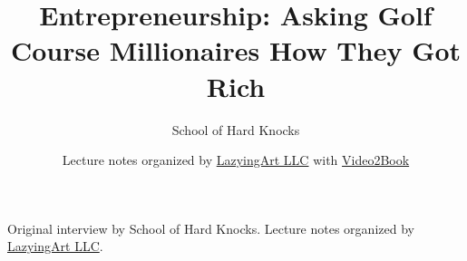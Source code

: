 \documentclass[11pt,oneside]{book}
\begin{document}
\frontmatter
\title{Entrepreneurship: Asking Golf Course Millionaires How They Got Rich}
\author{School of Hard Knocks}
\date{Lecture notes organized by \href{https://lazying.art}{LazyingArt LLC} with \href{https://github.com/lachlanchen/Video2Book}{Video2Book}}
\maketitle
\begin{center}
\small Original interview by School of Hard Knocks. Lecture notes organized by \href{https://lazying.art}{LazyingArt LLC}.
\end{center}
\clearpage
\mainmatter

\end{document}
